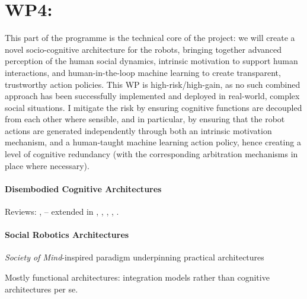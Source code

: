 \documentclass[11pt,a4paper]{report}
\begin{document}
\section{WP4: \textbf{\wpFour}}

\noindent{}


This part of the programme is the technical core of the project: we will create a
novel socio-cognitive architecture for the robots, bringing together advanced
perception of the human social dynamics, intrinsic motivation to support human
interactions, and human-in-the-loop machine learning to create transparent,
trustworthy action policies. This WP is high-risk/high-gain, as no such combined
approach has been successfully implemented and deployed in real-world, complex
social situations. I mitigate the risk by ensuring cognitive functions are
decoupled from each other where sensible, and in particular, by ensuring that
the robot actions are generated independently through both an intrinsic
motivation mechanism, and a human-taught machine learning action policy, hence
creating a level of cognitive redundancy (with the corresponding arbitration
mechanisms in place where necessary).


\paragraph{Disembodied Cognitive Architectures}

Reviews: \cite{chong2007integrated}, \cite{vernon2007survey} --
extended in \cite{kingdon2008review}, \cite{duch2008cognitive},
\cite{langley2009cognitive}, \cite{taatgen2010past},
\cite{thorisson2012cognitive}.


\paragraph{Social Robotics Architectures}\label{sec:robots}


\emph{Society of Mind}-inspired paradigm underpinning practical architectures

Mostly functional architectures: integration models rather than cognitive
architectures per se.
\end{document}
